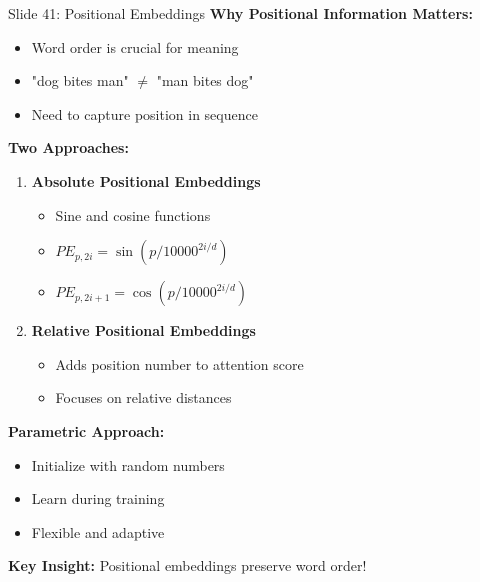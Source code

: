 \documentclass[8pt]{beamer}
\begin{document}
	\begin{frame}{Slide 41: Positional Embeddings}
		\fontsize{6.5}{7.5}\selectfont
		\textbf{Why Positional Information Matters:}
		\begin{itemize}
			\item Word order is crucial for meaning
			\item "dog bites man" $\neq$ "man bites dog"
			\item Need to capture position in sequence
		\end{itemize}
		
		\vspace{0.1cm}
		\textbf{Two Approaches:}
		\begin{enumerate}
			\item \textbf{Absolute Positional Embeddings}
			\begin{itemize}
				\item Sine and cosine functions
				\item $PE_{p,2i} = \sin(p/10000^{2i/d})$
				\item $PE_{p,2i+1} = \cos(p/10000^{2i/d})$
			\end{itemize}
			\item \textbf{Relative Positional Embeddings}
			\begin{itemize}
				\item Adds position number to attention score
				\item Focuses on relative distances
			\end{itemize}
		\end{enumerate}
		
		\vspace{0.1cm}
		\textbf{Parametric Approach:}
		\begin{itemize}
			\item Initialize with random numbers
			\item Learn during training
			\item Flexible and adaptive
		\end{itemize}
		
		\textcolor{myblue}{\textbf{Key Insight:}} Positional embeddings preserve word order!
	\end{frame}
	
\end{document}

